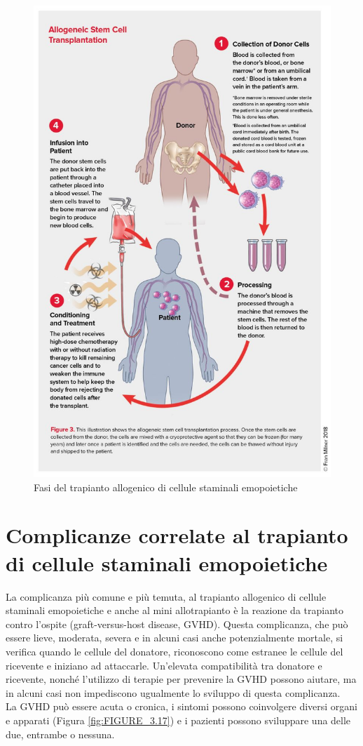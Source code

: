 \begin{figure}[H]
    \begin{center}
    \includegraphics[width=0.7\columnwidth]{img/ALLOGENICO.jpg}
    \vspace{-3mm}
    \end{center}
    \caption{Fasi del trapianto allogenico di cellule staminali emopoietiche
    \cite{LLSBLOOD}}
    \label{fig:FIGURE_3.10}
\end{figure}

\section{Complicanze correlate al trapianto di cellule staminali emopoietiche}

La complicanza più comune e più temuta, al trapianto allogenico di cellule staminali emopoietiche e anche al mini 
allotrapianto è la reazione da trapianto contro l’ospite (graft-versus-host disease, GVHD). Questa complicanza, 
che può essere lieve, moderata, severa e in alcuni casi anche potenzialmente mortale, si verifica quando le cellule 
del donatore, riconoscono come estranee le cellule del ricevente e iniziano ad attaccarle. Un’elevata compatibilità 
tra donatore e ricevente, nonché l’utilizzo di terapie per prevenire la GVHD possono aiutare, ma in alcuni casi non 
impediscono ugualmente lo sviluppo di questa complicanza.\\ 
La GVHD può essere acuta o cronica, i sintomi possono coinvolgere diversi organi e apparati (Figura \ref*{fig:FIGURE_3.17})
e i pazienti possono sviluppare una delle due, entrambe o nessuna\cite{LLSBLOOD}.

